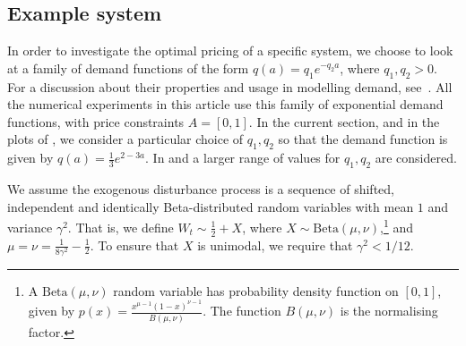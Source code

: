 \documentclass{rsproca_new}
\theoremstyle{definition}
\begin{document}
\subsection{Example system}\label{sec:bellman_example_markdown}
In order to investigate the optimal pricing of a specific system, we
choose to look at a family of demand functions of the form
$q(a)=q_1e^{-q_2a}$, where $q_1,q_2>0$. For a discussion
about their properties and usage in modelling demand, see~\cite[Ch.~7]{talluri2006theory}.
All the numerical experiments in this article use this family of exponential
demand functions, with price constraints $A=[0,1]$.
In the current section, and in the plots of ,
we consider a particular choice of $q_1,q_2$ so that the demand
function is given by $q(a)=\frac{1}{3}e^{2-3a}$.
In  and  a larger
range of values for $q_1,q_2$ are considered.

We assume the exogenous disturbance process is a sequence of
shifted, independent and identically Beta-distributed random
variables with mean $1$ and variance
$\gamma^2$. That is, we define $W_t\sim \frac{1}{2}+X$, where
$X\sim \mathrm{Beta}(\mu,\nu)$,\footnote{A
  $\mathrm{Beta}(\mu,\nu)$ random variable has probability density
  function on $[0,1]$, given by
  $p(x)=\frac{x^{\mu-1}{(1-x)}^{\nu-1}}{B(\mu,\nu)}$.
  The function $B(\mu,\nu)$ is the normalising factor.
}
and $\mu=\nu=\frac{1}{8\gamma^2}-\frac{1}{2}$.
To ensure that $X$ is unimodal, we require that $\gamma^2<1/12$.
\end{document}
